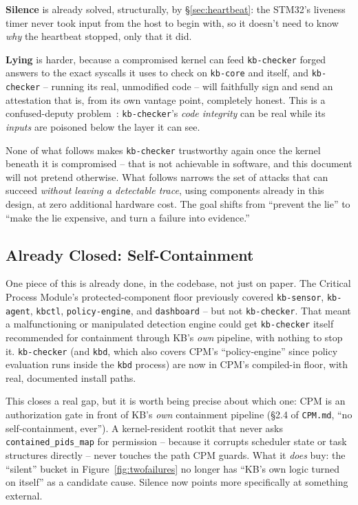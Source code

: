 \documentclass[11pt,a4paper]{article}
\begin{document}
\textbf{Silence} is already solved, structurally, by \S\ref{sec:heartbeat}: the STM32's liveness timer never took input from the host to begin with, so it doesn't need to know \emph{why} the heartbeat stopped, only that it did.

\textbf{Lying} is harder, because a compromised kernel can feed
\texttt{kb-checker} forged answers to the exact syscalls it uses to
check on \texttt{kb-core} and itself, and \texttt{kb-checker} -- running its
real, unmodified code -- will faithfully sign and send an attestation
that is, from its own vantage point, completely honest. This is a
confused-deputy problem~\cite{hardy1988}: \texttt{kb-checker}'s
\emph{code integrity} can be real while its \emph{inputs} are poisoned
below the layer it can see.

\begin{notebox}
None of what follows makes \texttt{kb-checker} trustworthy again once
the kernel beneath it is compromised -- that is not achievable in
software, and this document will not pretend otherwise. What follows
narrows the set of attacks that can succeed \emph{without leaving a
detectable trace}, using components already in this design, at zero
additional hardware cost. The goal shifts from ``prevent the lie'' to
``make the lie expensive, and turn a failure into evidence.''
\end{notebox}

\subsection{Already Closed: Self-Containment}
\label{sec:cpm-closed}

One piece of this is already done, in the codebase, not just on paper.
The Critical Process Module's protected-component floor previously
covered \texttt{kb-sensor}, \texttt{kb-agent}, \texttt{kbctl},
\texttt{policy-engine}, and \texttt{dashboard} -- but not
\texttt{kb-checker}. That meant a malfunctioning or manipulated
detection engine could get \texttt{kb-checker} itself recommended for
containment through KB's \emph{own} pipeline, with nothing to stop it.
\texttt{kb-checker} (and \texttt{kbd}, which also covers CPM's
``policy-engine'' since policy evaluation runs inside the \texttt{kbd}
process) are now in CPM's compiled-in floor, with real, documented
install paths.

This closes a real gap, but it is worth being precise about which one:
CPM is an authorization gate in front of KB's \emph{own} containment
pipeline (\S2.4 of \texttt{CPM.md}, ``no self-containment, ever''). A
kernel-resident rootkit that never asks \texttt{contained\_pids\_map}
for permission -- because it corrupts scheduler state or task
structures directly -- never touches the path CPM guards. What it
\emph{does} buy: the ``silent'' bucket in
Figure~\ref{fig:twofailures} no longer has ``KB's own logic turned on
itself'' as a candidate cause. Silence now points more specifically at
something external.
\end{document}
